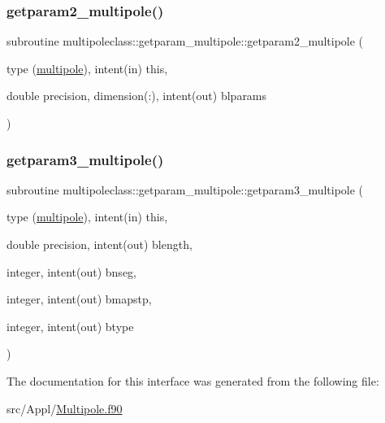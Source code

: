 \mbox{\label{interfacemultipoleclass_1_1getparam__multipole_a2aaeb8e25084463ca88ee950e1a22991}} 
\subsubsection{\texorpdfstring{getparam2\_multipole()}{getparam2\_multipole()}}
{\footnotesize\ttfamily subroutine multipoleclass\+::getparam\+\_\+multipole\+::getparam2\+\_\+multipole (\begin{DoxyParamCaption}\item[{type (\mbox{\hyperlink{namespacemultipoleclass_structmultipoleclass_1_1multipole}{multipole}}), intent(in)}]{this,  }\item[{double precision, dimension(\+:), intent(out)}]{blparams }\end{DoxyParamCaption})}

\mbox{\label{interfacemultipoleclass_1_1getparam__multipole_ae7de82d65165d1d0733e90e40ec032f7}} 
\subsubsection{\texorpdfstring{getparam3\_multipole()}{getparam3\_multipole()}}
{\footnotesize\ttfamily subroutine multipoleclass\+::getparam\+\_\+multipole\+::getparam3\+\_\+multipole (\begin{DoxyParamCaption}\item[{type (\mbox{\hyperlink{namespacemultipoleclass_structmultipoleclass_1_1multipole}{multipole}}), intent(in)}]{this,  }\item[{double precision, intent(out)}]{blength,  }\item[{integer, intent(out)}]{bnseg,  }\item[{integer, intent(out)}]{bmapstp,  }\item[{integer, intent(out)}]{btype }\end{DoxyParamCaption})}



The documentation for this interface was generated from the following file\+:\begin{DoxyCompactItemize}
\item 
src/\+Appl/\mbox{\hyperlink{_multipole_8f90}{Multipole.\+f90}}\end{DoxyCompactItemize}
